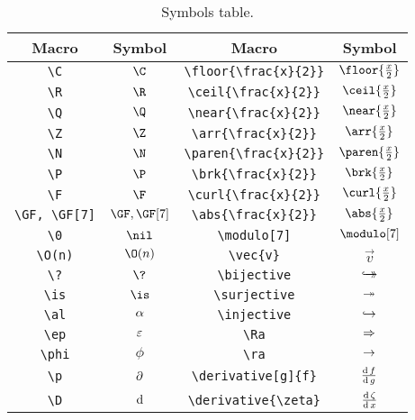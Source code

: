 \documentclass{homework}
\newcommand{\bk}{\textbackslash}
\newcommand{\dummy}[1]{\texttt{\bk #1\{\bk frac\{x\}\{2\}\}}}
\begin{document}
\begin{table}[hbtp]
  \begin{tabular}{ | c | c | c | c | }
    \hline
    Macro                      & Symbol       & Macro                               & Symbol                \\ \hline
    \texttt{\bk C}             & $\C$         & \dummy{floor}                       & $\floor{\frac{x}{2}}$ \\ \hline
    \texttt{\bk R}             & $\R$         & \dummy{ceil}                        & $\ceil{\frac{x}{2}}$  \\ \hline
    \texttt{\bk Q}             & $\Q$         & \dummy{near}                        & $\near{\frac{x}{2}}$  \\ \hline
    \texttt{\bk Z}             & $\Z$         & \dummy{arr}                         & $\arr{\frac{x}{2}}$   \\ \hline
    \texttt{\bk N}             & $\N$         & \dummy{paren}                       & $\paren{\frac{x}{2}}$ \\ \hline
    \texttt{\bk P}             & $\P$         & \dummy{brk}                         & $\brk{\frac{x}{2}}$   \\ \hline
    \texttt{\bk F}             & $\F$         & \dummy{curl}                        & $\curl{\frac{x}{2}}$  \\ \hline
    \texttt{\bk GF, \bk GF[7]} & $\GF,\GF[7]$ & \dummy{abs}                         & $\abs{\frac{x}{2}}$   \\ \hline
    \texttt{\bk 0}             & $\nil$       & \texttt{\bk modulo[7]}              & $\modulo[7]$          \\ \hline
    \texttt{\bk O(n)}          & $\O(n)$      & \texttt{\bk vec\{v\}}               & $\vec{v}$             \\ \hline
    \texttt{\bk ?}             & $\?$         & \texttt{\bk bijective}              & $\bijective$          \\ \hline
    \texttt{\bk is}            & $\is$        & \texttt{\bk surjective}             & $\surjective$         \\ \hline
    \texttt{\bk al}            & $\al$        & \texttt{\bk injective}              & $\injective$          \\ \hline
    \texttt{\bk ep}            & $\ep$        & \texttt{\bk Ra}                     & $\Ra$                 \\ \hline
    \texttt{\bk phi}           & $\phi$       & \texttt{\bk ra}                     & $\ra$                 \\ \hline
    \texttt{\bk p}             & $\p$         & \texttt{\bk derivative[g]\{f\}}     & $\derivative[g]{f}$   \\ \hline
    \texttt{\bk D}             & $\D$         & \texttt{\bk derivative\{\bk zeta\}} & $\derivative{\zeta}$  \\ \hline
  \end{tabular}
  \caption{Symbols table.}\label{symbols}
\end{table}
\end{document}
